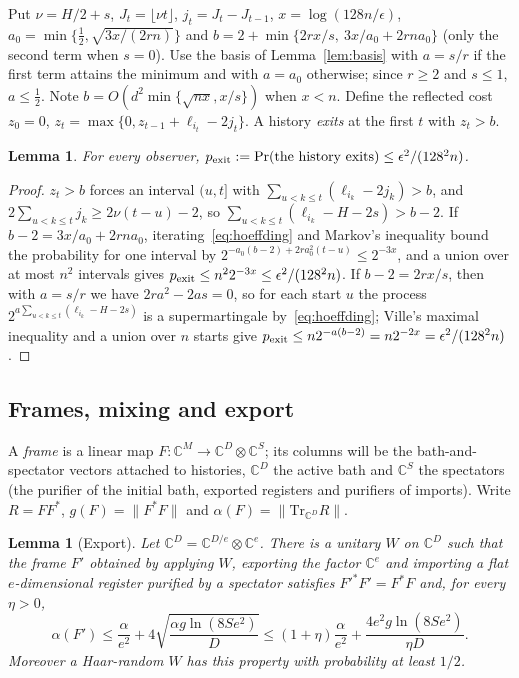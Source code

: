 \documentclass[11pt,a4paper]{article}
\theoremstyle{plain}
\newtheorem{lemma}[theorem]{Lemma}
\theoremstyle{definition}
\theoremstyle{remark}
\begin{document}
Put $\nu=H/2+s$, $J_t=\lfloor\nu t\rfloor$, $j_t=J_t-J_{t-1}$, $x=\log(128n/\epsilon)$, $a_0=\min\{\frac12,\sqrt{3x/(2rn)}\}$ and
$b=2+\min\{2rx/s,\ 3x/a_0+2rna_0\}$ (only the second term when $s=0$). Use the basis of Lemma~\ref{lem:basis} with $a=s/r$ if the
first term attains the minimum and with $a=a_0$ otherwise; since $r\ge2$ and $s\le1$, $a\le\frac12$. Note
$b=O(d^2\min\{\sqrt{nx},x/s\})$ when $x<n$. Define the reflected cost $z_0=0$, $z_t=\max\{0,z_{t-1}+\ell_{i_t}-2j_t\}$. A history
\emph{exits} at the first $t$ with $z_t>b$.

\begin{lemma}\label{lem:tail}
For every observer, $p_{\rm exit}:=\Pr(\text{the history exits})\le\epsilon^2/(128^2n)$.
\end{lemma}

\begin{proof}
$z_t>b$ forces an interval $(u,t]$ with $\sum_{u<k\le t}(\ell_{i_k}-2j_k)>b$, and $2\sum_{u<k\le t}j_k\ge2\nu(t-u)-2$, so
$\sum_{u<k\le t}(\ell_{i_k}-H-2s)>b-2$. If $b-2=3x/a_0+2rna_0$, iterating~\eqref{eq:hoeffding} and Markov's inequality bound the
probability for one interval by $2^{-a_0(b-2)+2ra_0^2(t-u)}\le2^{-3x}$, and a union over at most $n^2$ intervals gives
$p_{\rm exit}\le n^22^{-3x}\le\epsilon^2/(128^2n)$. If $b-2=2rx/s$, then with $a=s/r$ we have $2ra^2-2as=0$, so for each start $u$
the process $2^{a\sum_{u<k\le t}(\ell_{i_k}-H-2s)}$ is a supermartingale by~\eqref{eq:hoeffding}; Ville's maximal inequality and a
union over $n$ starts give $p_{\rm exit}\le n2^{-a(b-2)}=n2^{-2x}=\epsilon^2/(128^2n)$.
\end{proof}

\subsection{Frames, mixing and export}

A \emph{frame} is a linear map $F:\mathbb{C}^M\to\mathbb{C}^D\otimes\mathbb{C}^S$; its columns will be the bath-and-spectator
vectors attached to histories, $\mathbb{C}^D$ the active bath and $\mathbb{C}^S$ the spectators (the purifier of the initial
bath, exported registers and purifiers of imports). Write $R=FF^*$, $g(F)=\|F^*F\|$ and $\alpha(F)=\|\mathrm{Tr}_{\mathbb{C}^D}R\|$.

\begin{lemma}[Export]\label{lem:export}
Let $\mathbb{C}^D=\mathbb{C}^{D/e}\otimes\mathbb{C}^e$. There is a unitary $W$ on $\mathbb{C}^D$ such that the frame $F'$
obtained by applying $W$, exporting the factor $\mathbb{C}^e$ and importing a flat $e$-dimensional register purified by a
spectator satisfies $F'^*F'=F^*F$ and, for every $\eta>0$,
\[
\alpha(F')\le\frac{\alpha}{e^2}+4\sqrt{\frac{\alpha g\ln(8Se^2)}{D}}\le(1+\eta)\frac{\alpha}{e^2}+\frac{4e^2g\ln(8Se^2)}{\eta D}.
\]
Moreover a Haar-random $W$ has this property with probability at least $1/2$.
\end{lemma}
\end{document}
